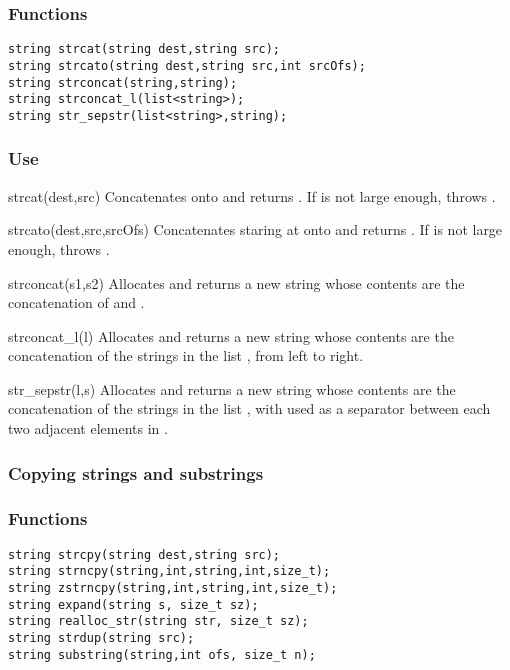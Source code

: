 \subsubsection*{Functions}
\begin{verbatim}
string strcat(string dest,string src);
string strcato(string dest,string src,int srcOfs);
string strconcat(string,string);
string strconcat_l(list<string>);
string str_sepstr(list<string>,string);
\end{verbatim}

\subsubsection*{Use}

\begin{defun}{strcat}{(dest,src)}
Concatenates  onto  and returns .  If
 is not large enough,  throws
.
\end{defun}

\begin{defun}{strcato}{(dest,src,srcOfs)}
Concatenates  staring at  onto  and
returns .  If  is not large enough, 
throws .
\end{defun}

\begin{defun}{strconcat}{(s1,s2)}
Allocates and returns a new string whose contents are the concatenation
of  and .
\end{defun}

\begin{defun}{strconcat_l}{(l)}
Allocates and returns a new string whose contents are the concatenation
of the strings in the list , from left to right.
\end{defun}

\begin{defun}{str_sepstr}{(l,s)}
Allocates and returns a new string whose contents are the concatenation
of the strings in the list , with  used as a separator
between each two adjacent elements in .
\end{defun}

\subsubsection*{Copying strings and substrings}
\subsubsection*{Functions}
\begin{verbatim}
string strcpy(string dest,string src); 
string strncpy(string,int,string,int,size_t);
string zstrncpy(string,int,string,int,size_t);
string expand(string s, size_t sz);
string realloc_str(string str, size_t sz);
string strdup(string src);
string substring(string,int ofs, size_t n);
\end{verbatim}

